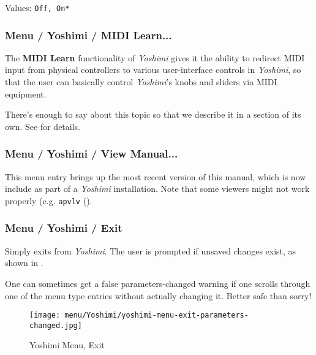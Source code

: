    Values: \texttt{Off, On*}

\subsubsection{Menu / Yoshimi / MIDI Learn...}
\label{subsubsec:menu_yoshimi_midi_learn}

   The \textbf{MIDI Learn} functionality of \textsl{Yoshimi} gives it the
   ability to redirect MIDI input from physical controllers to various
   user-interface controls in \textsl{Yoshimi}, so that the user can basically
   control \textsl{Yoshimi}'s knobs and sliders via MIDI equipment.

   There's enough to say about this topic so that we describe it in a section
   of its own.
   See  for details.

\subsubsection{Menu / Yoshimi / View Manual...}
\label{subsubsec:menu_yoshimi_view_manual}

   This menu entry brings up the most recent version of this manual, which is
   now include as part of a \textsl{Yoshimi} installation.
   Note that some viewers might not work properly
   (e.g. \texttt{apvlv} (\cite{apvlv}).

\subsubsection{Menu / Yoshimi / Exit}
\label{subsubsec:menu_yoshimi_exit}

   Simply exits from \textsl{Yoshimi}.
   The user is prompted if unsaved changes exist, as shown in
   .

   One can sometimes get a false parameters-changed warning if one
   scrolls through one of the menu type entries without actually changing it.
   Better safe than sorry!

\begin{figure}[H]
   \centering
   \texttt{[image: menu/Yoshimi/yoshimi-menu-exit-parameters-changed.jpg]}
   \caption[Yoshimi Menu, Exit]{Yoshimi Menu, Exit}
   \label{fig:yoshimi_change_exit}
\end{figure}

%
% 

